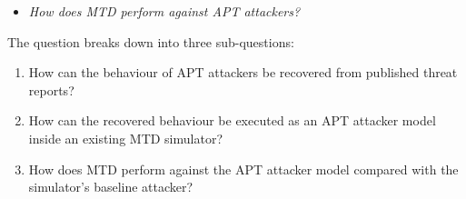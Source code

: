 \documentclass{cshonours}
\begin{document}
\begin{itemize}[label={}, leftmargin=3em, topsep=0.5\baselineskip,
                partopsep=0pt]
  \item \itshape How does MTD perform against APT attackers?
\end{itemize}
\noindent The question breaks down into three sub-questions:
\begin{enumerate}[label=SQ\arabic*, ref=SQ\arabic*, align=left,
                  leftmargin=3em, labelwidth=2.5em, labelsep=0.5em,
                  itemsep=0pt, parsep=0pt, topsep=0.5\baselineskip,
                  partopsep=0pt]
  \item\label{sq:capture} How can the behaviour of APT attackers be
  recovered from published threat reports?
  \item\label{sq:model} How can the recovered behaviour be executed as
  an APT attacker model inside an existing MTD simulator?
  \item\label{sq:evaluate} How does MTD perform against the APT attacker
  model compared with the simulator's baseline attacker?
\end{enumerate}
\end{document}
